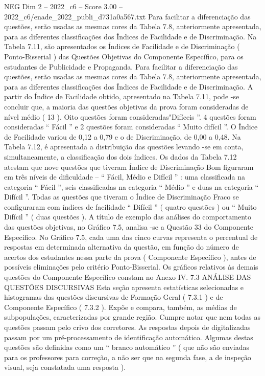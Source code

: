 \begin{textsample}{NEG Dim 2 – 2022\_c6 – Score 3.00 – 2022\_c6/enade\_2022\_publi\_d731a0a567.txt}
Para facilitar a diferenciação das questões, serão usadas as mesmas cores da Tabela 7.8, anteriormente apresentada, para as diferentes classificações dos Índices de Facilidade e de Discriminação.
Na Tabela 7.11, são apresentados os Índices de Facilidade e de Discriminação ( Ponto-Bisserial ) das Questões Objetivas do Componente Específico, para os estudantes de Publicidade e Propaganda.
Para facilitar a diferenciação das questões, serão usadas as mesmas cores da Tabela 7.8, anteriormente apresentada, para as diferentes classificações dos Índices de Facilidade e de Discriminação.
A partir do Índice de Facilidade obtido, apresentado na Tabela 7.11, pode -se concluir que, a maioria das questões objetivas da prova foram consideradas de nível médio ( 13 ).
Oito questões foram consideradas"Difíceis ”. 4 questões foram consideradas “ Fácil ” e 2 questões foram consideradas “ Muito difícil ”.
O Índice de Facilidade variou de 0,12 a 0,79 e o de Discriminação, de 0,00 a 0,48.
Na Tabela 7.12, é apresentada a distribuição das questões levando -se em conta, simultaneamente, a classificação dos dois índices.
Os dados da Tabela 7.12 atestam que nove questões que tiveram Índice de Discriminação Bom figuraram em três níveis de dificuldade – “ Fácil, Médio e Difícil ” : uma classificada na categoria “ Fácil ”, seis classificadas na categoria “ Médio ” e duas na categoria “ Difícil ”.
Todas as questões que tiveram o Índice de Discriminação Fraco se configuraram com índices de facilidade “ Difícil ” ( quatro questões ) ou “ Muito Difícil ” ( duas questões ).
A título de exemplo das análises do comportamento das questões objetivas, no Gráfico 7.5, analisa -se a Questão 33 do Componente Específico.
No Gráfico 7.5, cada uma das cinco curvas representa o percentual de respostas em determinada alternativa da questão, em função do número de acertos dos estudantes nessa parte da prova ( Componente Específico ), antes de possíveis eliminações pelo critério Ponto-Bisserial.
Os gráficos relativos às demais questões do Componente Específico constam no Anexo IV. 7.3 ANÁLISE DAS QUESTÕES DISCURSIVAS Esta seção apresenta estatísticas selecionadas e histogramas das questões discursivas de Formação Geral ( 7.3.1 ) e de Componente Específico ( 7.3.2 ).
Expõe e compara, também, as médias de subpopulações, caracterizadas por grande região.
Cumpre notar que nem todas as questões passam pelo crivo dos corretores.
As respostas depois de digitalizadas passam por um pré-processamento de identificação automático.
Algumas destas questões são definidas como um “ branco automático ” ( que não são enviadas para os professores para correção, a não ser que na segunda fase, a de inspeção visual, seja constatada uma resposta ).

\end{textsample}
